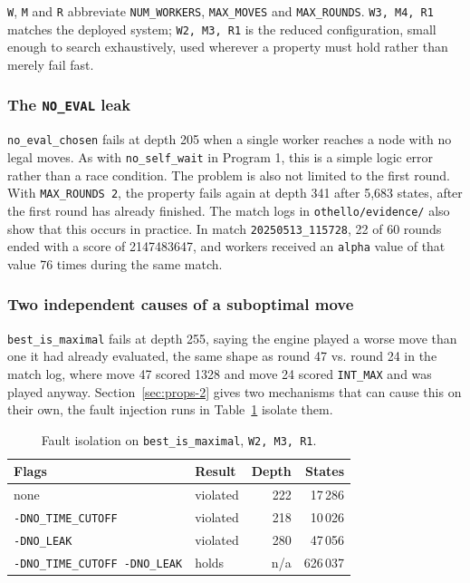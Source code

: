 \documentclass[10pt,a4paper]{article}
\newcommand{\code}[1]{\texttt{#1}}
\begin{document}
\code{W}, \code{M} and \code{R} abbreviate \code{NUM\_WORKERS},
\code{MAX\_MOVES} and \code{MAX\_ROUNDS}. \code{W3, M4, R1} matches the
deployed system; \code{W2, M3, R1} is the reduced configuration, small
enough to search exhaustively, used wherever a property must hold rather
than merely fail fast.

\subsubsection*{The \code{NO\_EVAL} leak}

\code{no\_eval\_chosen} fails at depth 205 when a single worker reaches a node 
with no legal moves. As with \code{no\_self\_wait} in Program 1, this is a 
simple logic error rather than a race condition. The problem is also not 
limited to the first round. With \code{MAX\_ROUNDS 2}, the property fails 
again at depth 341 after 5,683 states, after the first round has already 
finished. The match logs in \code{othello/evidence/} also show that this 
occurs in practice. In match \code{20250513\_115728}, 22 of 60 rounds ended 
with a score of 2147483647, and workers received an \code{alpha} value of that value
76 times during the same match.

\subsubsection*{Two independent causes of a suboptimal move}

\code{best\_is\_maximal} fails at depth 255, saying the engine played a
worse move than one it had already evaluated, the same shape as round 47
vs. round 24 in the match log, where move 47 scored 1328 and move 24
scored \code{INT\_MAX} and was played anyway. Section~\ref{sec:props-2}
gives two mechanisms that can cause this on their own, the fault injection
runs in Table~\ref{tab:fault} isolate them.

\begin{table}[htbp]
\centering
\caption{Fault isolation on \code{best\_is\_maximal}, \code{W2, M3, R1}.}
\label{tab:fault}
\begin{tabular}{l l r r}
\toprule
\textbf{Flags} & \textbf{Result} & \textbf{Depth} & \textbf{States} \\
\midrule
none & violated & 222 & 17\,286 \\
\code{-DNO\_TIME\_CUTOFF} & violated & 218 & 10\,026 \\
\code{-DNO\_LEAK} & violated & 280 & 47\,056 \\
\code{-DNO\_TIME\_CUTOFF -DNO\_LEAK} & holds & n/a & 626\,037 \\
\bottomrule
\end{tabular}
\end{table}
\end{document}
